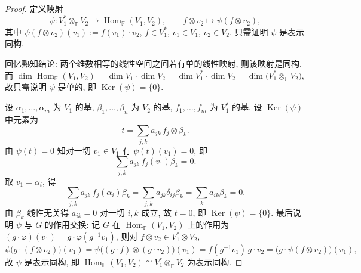 \begin{proof}
定义映射
\begin{equation*}
  \psi\colon V_1^*\otimes_{\mathbb{F}} V_2\longrightarrow\operatorname{Hom}_{\mathbb{F}}(V_1,V_2),\qquad f\otimes v_2\longmapsto\psi(f\otimes v_2),
\end{equation*}
其中 $\psi(f\otimes v_2)(v_1):=f(v_1)\cdot v_2$, $f\in V_1^*$, $v_1\in V_1$, $v_2\in V_2$.
只需证明 $\psi$ 是表示同构.

回忆熟知结论: 两个维数相等的线性空间之间若有单的线性映射, 则该映射是同构.
而 $\dim\operatorname{Hom}_{\mathbb{F}}(V_1,V_2)=\dim V_1\cdot\dim V_2
=\dim V_1^*\cdot\dim V_2=\dim\bigl(V_1^*\otimes_{\mathbb{F}} V_2\bigr)$,
故只需说明 $\psi$ 是单的, 即 $\operatorname{Ker}(\psi)=\{0\}$.

设 $\alpha_1,\dots,\alpha_m$ 为 $V_1$ 的基, $\beta_1,\dots,\beta_n$ 为 $V_2$ 的基,
$f_1,\dots,f_m$ 为 $V_1^*$ 的基. 设 $\operatorname{Ker}(\psi)$ 中元素为
\begin{equation*}
  t=\sum_{j,k}a_{jk}\,f_j\otimes\beta_k .
\end{equation*}
由 $\psi(t)=0$ 知对一切 $v_1\in V_1$ 有 $\psi(t)(v_1)=0$, 即
\begin{equation*}
  \sum_{j,k}a_{jk}\,f_j(v_1)\beta_k=0 .
\end{equation*}
取 $v_1=\alpha_i$, 得
\begin{equation*}
  \sum_{j,k}a_{jk}\,f_j(\alpha_i)\beta_k=\sum_{j,k}a_{jk}\delta_{ij}\beta_k=\sum_k a_{ik}\beta_k=0 .
\end{equation*}
由 $\beta_k$ 线性无关得 $a_{ik}=0$ 对一切 $i,k$ 成立, 故 $t=0$, 即 $\operatorname{Ker}(\psi)=\{0\}$.
最后说明 $\psi$ 与 $G$ 的作用交换: 记 $G$ 在 $\operatorname{Hom}_{\mathbb{F}}(V_1,V_2)$ 上的作用为
$(g\cdot\varphi)(v_1)=g\cdot\varphi(g^{-1}v_1)$, 则对 $f\otimes v_2\in V_1^*\otimes V_2$,
\[
  \psi\bigl(g\cdot(f\otimes v_2)\bigr)(v_1)
  =\psi\bigl((g\cdot f)\otimes(g\cdot v_2)\bigr)(v_1)
  =f(g^{-1}v_1)\,g\cdot v_2
  =\bigl(g\cdot\psi(f\otimes v_2)\bigr)(v_1),
\]
故 $\psi$ 是表示同构, 即 $\operatorname{Hom}_{\mathbb{F}}(V_1,V_2)\cong V_1^*\otimes_{\mathbb{F}} V_2$ 为表示同构.
\end{proof}

